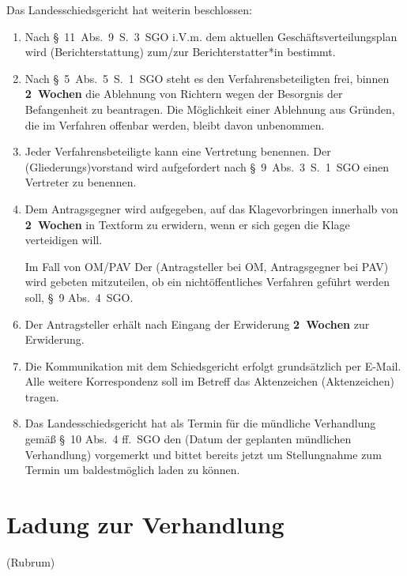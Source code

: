 Das Landesschiedsgericht hat weiterin beschlossen:
\begin{enumerate}
\item Nach §~11~Abs.~9~S.~3~SGO i.V.m. dem aktuellen Geschäftsverteilungsplan wird (Berichterstattung) zum/zur Berichterstatter*in bestimmt.
\item Nach §~5~Abs.~5~S.~1~SGO steht es den Verfahrensbeteiligten frei, binnen \textbf{2~Wochen} die Ablehnung von Richtern wegen der Besorgnis der Befangenheit zu beantragen. Die Möglichkeit einer Ablehnung aus Gründen, die im Verfahren offenbar werden, bleibt davon unbenommen.
\item Jeder Verfahrensbeteiligte kann eine Vertretung benennen. Der (Gliederungs)vorstand wird aufgefordert nach §~9~Abs.~3~S.~1~SGO einen Vertreter zu benennen.
\item Dem Antragsgegner wird aufgegeben, auf das Klagevorbringen innerhalb von \textbf{2~Wochen} in Textform zu erwidern, wenn er sich gegen die Klage verteidigen will.
\item [Im Fall von OM/PAV] Der (Antragsteller bei OM, Antragsgegner bei PAV) wird gebeten mitzuteilen, ob ein nichtöffentliches Verfahren geführt werden soll, \S~9 Abs.~4~SGO.
\item Der Antragsteller erhält nach Eingang der Erwiderung \textbf{2~Wochen} zur Erwiderung.
\item Die Kommunikation mit dem Schiedsgericht erfolgt grundsätzlich per E-Mail. Alle weitere Korrespondenz soll im Betreff das Aktenzeichen (Aktenzeichen) tragen.
\item Das Landesschiedsgericht hat als Termin für die mündliche Verhandlung gemäß \S~10 Abs.~4 ff.~SGO den (Datum der geplanten mündlichen Verhandlung) vorgemerkt und bittet bereits jetzt um Stellungnahme zum Termin um baldestmöglich laden zu können.
\end{enumerate}


\section{Ladung zur Verhandlung}
\label{Vorlage:Verhandlungsladung}
(Rubrum)

